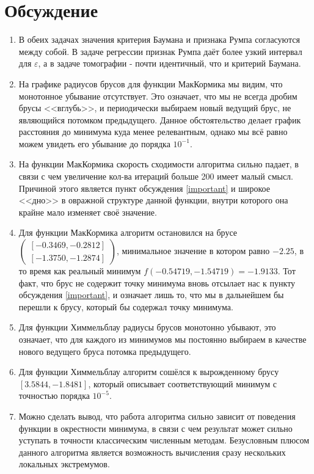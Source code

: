 \section{Обсуждение}
\begin{enumerate}
    \item В обеих задачах значения критерия Баумана и признака Румпа согласуются между собой. В задаче регрессии признак Румпа даёт более узкий интервал для $\varepsilon$, а в задаче томографии - почти идентичный, что и критерий Баумана.
    \item \label{important}На графике радиусов брусов для функции МакКормика мы видим, что монотонное убывание отсутствует. Это означает, что мы не всегда дробим брусы <<вглубь>>, и периодически выбираем новый ведущий брус, не являющийся потомком предыдущего. Данное обстоятельство делает график расстояния до минимума куда менее релевантным, однако мы всё равно можем увидеть его убывание до порядка $10^{-1}$.
    \item На функции МакКормика скорость сходимости алгоритма сильно падает, в связи с чем увеличение кол-ва итераций больше 200 имеет малый смысл. Причиной этого является пункт обсуждения \eqref{important} и широкое <<дно>> в овражной структуре данной функции, внутри которого она крайне мало изменяет своё значение.
    \item Для функции МакКормика алгоритм остановился на брусе $\begin{pmatrix}
    [   -0.3469,   -0.2812] \\
    [   -1.3750,   -1.2874] \end{pmatrix}$, минимальное значение в котором равно $-2.25$, в то время как реальный минимум  $f(-0.54719, -1.54719)=-1.9133$. Тот факт, что брус не содержит точку минимума вновь отсылает нас к пункту обсуждения \eqref{important}, и означает лишь то, что мы в дальнейшем бы перешли к брусу, который бы содержал точку минимума.
    \item Для функции Химмельблау радиусы брусов монотонно убывают, это означает, что для каждого из минимумов мы постоянно выбираем в качестве нового ведущего бруса потомка предыдущего.
    \item Для функции Химмельблау алгоритм сошёлся к вырожденному брусу $[ 3.5844,   -1.8481]$, который описывает соответствующий минимум с точностью порядка $10^{-5}$.
    \item Можно сделать вывод, что работа алгоритма сильно зависит от поведения функции в окрестности минимума, в связи с чем результат может сильно уступать в точности классическим численным методам. Безусловным плюсом данного алгоритма является возможность вычисления сразу нескольких локальных экстремумов.
\end{enumerate}